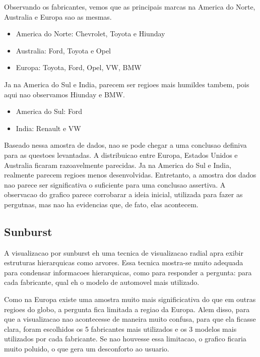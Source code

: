 \documentclass[10pt, conference]{IEEEtran}
\begin{document}
Observando os fabricantes, vemos que as principais marcas na America do Norte, Australia e Europa
sao as mesmas.

\begin{itemize}
  \item America do Norte: Chevrolet, Toyota e Hiunday
  \item Australia: Ford, Toyota e Opel
  \item Europa: Toyota, Ford, Opel, VW, BMW
\end{itemize}

Ja na America do Sul e India, parecem ser regioes mais humildes tambem, pois aqui nao observamos
Hiunday e BMW.

\begin{itemize}
  \item America do Sul: Ford
  \item India: Renault e VW
\end{itemize}

Baseado nessa amostra de dados, nao se pode chegar a uma conclusao definiva para as
questoes levantadas. A distribuicao entre Europa, Estados Unidos e Australia ficaram razoavelmente
parecidas. Ja na America do Sul e India, realmente parecem regioes menos desenvolvidas. Entretanto,
a amostra dos dados nao parece ser significativa o suficiente para uma conclusao assertiva. A observacao
do grafico parece corrobarar a ideia inicial, utilizada para fazer as pergutnas, mas nao ha evidencias
que, de fato, elas acontecem.



\subsection{Sunburst}

A visualizacao por sunburst eh uma tecnica de visualizacao radial apra exibir estruturas hierarquicas
como arvores. Essa tecnica mostra-se muito adequada para condensar informacoes hierarquicas, 
como para responder a pergunta:
para cada fabricante, qual eh o modelo de automovel mais utilizado. 

Como na Europa existe uma amostra muito mais significicativa do que em outras regioes do globo, a
pergunta fica limitada a regiao da Europa. Alem disso, para que a visualizacao nao acontecesse de maneira
muito confusa, para que ela ficasse clara, foram escolhidos os 5 fabricantes mais utilizados e os 3 modelos
mais utilizados por cada fabricante. Se nao houvesse essa limitacao, o grafico ficaria muito poluido, o que
gera um desconforto ao usuario.
\end{document}
